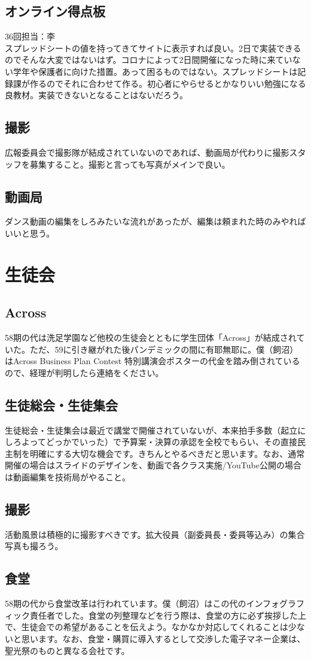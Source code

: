 \documentclass[dvipdfmx,jb5]{jreport}
\newcommand{\Chapter}[1]{\chapter{#1}\thispagestyle{fancy}}
\begin{document}
\section{オンライン得点板}
36回担当：李\\

スプレッドシートの値を持ってきてサイトに表示すれば良い。2日で実装できるのでそんな大変ではないはず。コロナによって2日間開催になった時に来ていない学年や保護者に向けた措置。あって困るものではない。スプレッドシートは記録課が作るのでそれに合わせて作る。初心者にやらせるとかなりいい勉強になる良教材。実装できないとなることはないだろう。
\section{撮影}
広報委員会で撮影隊が結成されていないのであれば、動画局が代わりに撮影スタッフを募集すること。撮影と言っても写真がメインで良い。
\section{動画局}
ダンス動画の編集をしろみたいな流れがあったが、編集は頼まれた時のみやればいいと思う。
\Chapter{生徒会}
\section{Across}
58期の代は洗足学園など他校の生徒会とともに学生団体「Across」が結成されていた。ただ、59に引き継がれた後パンデミックの間に有耶無耶に。僕（飼沼）はAcross Business Plan Contest 特別講演会ポスターの代金を踏み倒されているので、経理が判明したら連絡をください。

\section{生徒総会・生徒集会}
生徒総会・生徒集会は最近で講堂で開催されていないが、本来拍手多数（起立にしろよってどっかでいった）で予算案・決算の承認を全校でもらい、その直接民主制を明確にする大切な機会です。きちんとやるべきだと思います。なお、通常開催の場合はスライドのデザインを、動画で各クラス実施/YouTube公開の場合は動画編集を技術局がやること。

\section{撮影}
活動風景は積極的に撮影すべきです。拡大役員（副委員長・委員等込み）の集合写真も撮ろう。

\section{食堂}
58期の代から食堂改革は行われています。僕（飼沼）はこの代のインフォグラフィック責任者でした。食堂の列整理などを行う際は、食堂の方に必ず挨拶した上で、生徒会での希望があることを伝えよう。なかなか対応してくれることは少ないと思います。なお、食堂・購買に導入するとして交渉した電子マネー企業は、聖光祭のものと異なる会社です。
\end{document}
